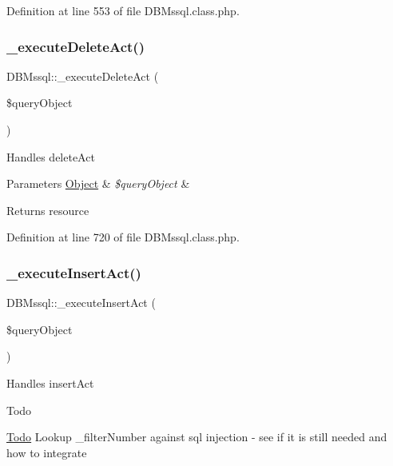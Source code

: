 Definition at line 553 of file D\+B\+Mssql.\+class.\+php.

\mbox{\label{classDBMssql_a871bd07e7224b27daba828686ee57a8a}} 
\subsubsection{\texorpdfstring{\+\_\+execute\+Delete\+Act()}{\_executeDeleteAct()}}
{\footnotesize\ttfamily D\+B\+Mssql\+::\+\_\+execute\+Delete\+Act (\begin{DoxyParamCaption}\item[{}]{\$query\+Object }\end{DoxyParamCaption})}

Handles delete\+Act 
\begin{DoxyParams}[1]{Parameters}
\hyperlink{classObject}{Object} & {\em \$query\+Object} & \\
\hline
\end{DoxyParams}
\begin{DoxyReturn}{Returns}
resource 
\end{DoxyReturn}


Definition at line 720 of file D\+B\+Mssql.\+class.\+php.

\mbox{\label{classDBMssql_aa3f04ce5bee8d9e11db7de7293055fef}} 
\subsubsection{\texorpdfstring{\+\_\+execute\+Insert\+Act()}{\_executeInsertAct()}}
{\footnotesize\ttfamily D\+B\+Mssql\+::\+\_\+execute\+Insert\+Act (\begin{DoxyParamCaption}\item[{}]{\$query\+Object }\end{DoxyParamCaption})}

Handles insert\+Act \begin{DoxyRefDesc}{Todo}
\item[\hyperlink{todo__todo000002}{Todo}]Lookup \+\_\+filter\+Number against sql injection -\/ see if it is still needed and how to integrate \end{DoxyRefDesc}

